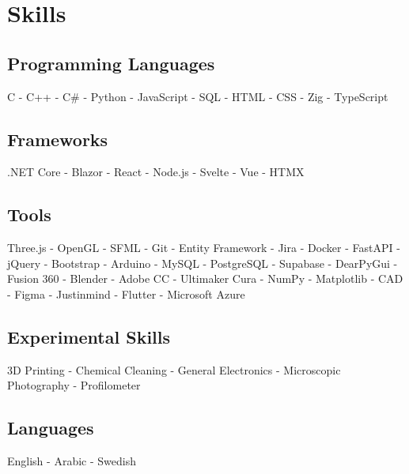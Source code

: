 \documentclass{article}
\begin{document}
\newpage 
\begin{minipage}[t]{1\textwidth}
    \section{Skills}
    
    \subsection{Programming Languages}
    \vspace{-0.5em} %
    \normalsize{C - C++ - C\# - Python - JavaScript - SQL - HTML - CSS - Zig - TypeScript}
    \vspace{0.5em} %
    
    \subsection{Frameworks}
   \vspace{-0.5em} %
    \normalsize{.NET Core - Blazor - React - Node.js - Svelte - Vue - HTMX}
    \vspace{0.5em} %
    
    \subsection{Tools}
    \vspace{-0.5em} %
    \normalsize{Three.js - OpenGL - SFML - Git - Entity Framework - Jira - Docker - FastAPI - jQuery - Bootstrap - Arduino - MySQL - PostgreSQL - Supabase - DearPyGui - Fusion 360 - Blender - Adobe CC - Ultimaker Cura - NumPy - Matplotlib - CAD - Figma - Justinmind - Flutter - Microsoft Azure} 
    \vspace{0.5em} %

    \subsection{Experimental Skills}
    \vspace{-0.5em} %
    \normalsize{3D Printing - Chemical Cleaning - General Electronics - Microscopic Photography - Profilometer}
    \vspace{0.5em} %
 
    \subsection{Languages}
    \vspace{-0.5em} %
    \normalsize{English - Arabic - Swedish}
    \vspace{0.5em} %
\end{minipage}
\end{document}
